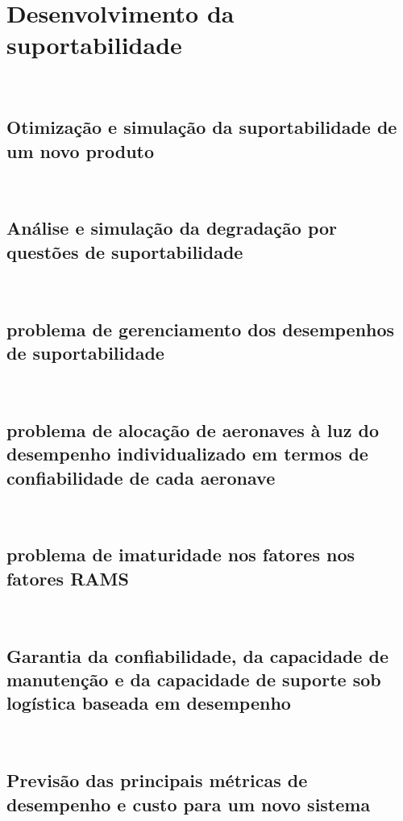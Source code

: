 \documentclass{amsart}
\begin{document}
\section{Desenvolvimento da suportabilidade}\


\subsection{Otimização e simulação da suportabilidade de um novo produto}\

\subsection{Análise e simulação da degradação por questões de suportabilidade}\

\subsection{problema de gerenciamento dos desempenhos de suportabilidade}\

\subsection{problema de alocação de aeronaves à luz do desempenho individualizado em termos de confiabilidade de cada aeronave}\

\subsection{problema de imaturidade nos fatores nos fatores RAMS}\

\subsection{Garantia da confiabilidade, da capacidade de manutenção e da capacidade de suporte sob logística baseada em desempenho}\

\subsection{Previsão das principais métricas de desempenho e custo para um novo sistema}\
\end{document}
